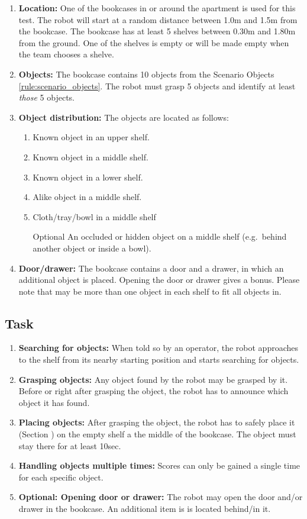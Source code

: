 \begin{enumerate}
\item \textbf{Location:} One of the bookcases in or around the apartment is used for this test. The robot will start at a random distance between 1.0m and 1.5m from the bookcase.
The bookcase has at least 5 shelves between 0.30m and 1.80m from the ground. One of the shelves is empty or will be made empty when the team chooses a shelve.
\item \textbf{Objects:} The bookcase contains 10 objects from the Scenario Objects \ref{rule:scenario_objects}.
  The robot must grasp 5 objects and identify at least \emph{those} 5 objects. 
\item \textbf{Object distribution:} The objects are located as follows:
\begin{enumerate}
\item Known object in an upper shelf.
\item Known object in a middle shelf.
\item Known object in a lower shelf.
\item Alike object in a middle shelf.
\item Cloth/tray/bowl in a middle shelf
\item[Optional] An occluded or hidden object on a middle shelf (e.g.~behind another object or inside a bowl).
\end{enumerate}
\item \textbf{Door/drawer:} The bookcase contains a door and a drawer, in which an additional object is placed. Opening the door or drawer gives a bonus. 
Please note that may be more than one object in each shelf to fit all objects in.
\end{enumerate}

\subsection{Task}
\begin{enumerate}
\item \textbf{Searching for objects:} When told so by an operator, the robot approaches to the shelf from its nearby starting position and starts searching for objects.
\item \textbf{Grasping objects:} Any object found by the robot may be grasped by it. Before or right after grasping the object, the robot has to announce which object it has found.
\item \textbf{Placing objects:} After grasping the object, the robot has to safely place it (Section ) on the empty shelf a the middle of the bookcase. 
  The object must stay there for at least 10sec.
\item \textbf{Handling objects multiple times:} Scores can only be gained a single time for each specific object.
\item \textbf{Optional: Opening door or drawer:} The robot may open the door and/or drawer in the bookcase. An additional item is is located behind/in it. 
\end{enumerate}

